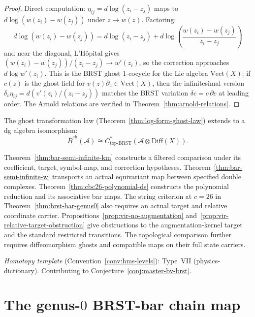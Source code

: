 \begin{proof}
Direct computation: $\eta_{ij} = d\log(z_i - z_j)$
maps to $d\log(w(z_i) - w(z_j))$ under $z \to w(z)$.
Factoring:
\[
d\log(w(z_i) - w(z_j)) = d\log(z_i - z_j)
+ d\log\!\left(\frac{w(z_i) - w(z_j)}{z_i - z_j}\right)
\]
and near the diagonal, L'H\^opital gives
$(w(z_i) - w(z_j))/(z_i - z_j) \to w'(z_i)$, so
the correction approaches $d\log w'(z_i)$.  This is
the BRST ghost 1-cocycle for the Lie algebra
$\mathrm{Vect}(X)$: if $c(z)$ is the ghost field for
$v(z)\partial_z \in \mathrm{Vect}(X)$, then the
infinitesimal version
$\delta_v \eta_{ij} = d(v'(z_i)/(z_i - z_j))$ matches
the BRST variation $\delta c = c\,\partial c$ at leading
order.  The Arnold relations are verified in
Theorem~\ref{thm:arnold-relations}.
\end{proof}

\begin{conjecture}[Bar complex \texorpdfstring{$=$}{=} topological BRST;
\ClaimStatusConjectured]
\label{conj:bar-topological-brst}
The ghost transformation law
(Theorem~\ref{thm:log-form-ghost-law}) extends to a dg
algebra isomorphism:
\[
\bar{B}^{\mathrm{ch}}(\mathcal{A}) \cong
C^*_{\mathrm{top}\text{-}\mathrm{BRST}}(\mathcal{A}
\otimes \mathrm{Diff}(X)).
\]
\end{conjecture}

\begin{remark}
\label{rem:topological-brst-scope}
Theorem~\ref{thm:bar-semi-infinite-km} constructs a filtered comparison under its coefficient, target, symbol-map, and correction hypotheses.
Theorem~\ref{thm:bar-semi-infinite-w} transports an actual equivariant map between specified double complexes.
Theorem~\ref{thm:cbc26-polynomial-ds} constructs the polynomial reduction and its associative bar maps.
The string criterion at $c=26$ in Theorem~\ref{thm:brst-bar-genus0} also requires an actual target and relative coordinate carrier.
Propositions~\ref{prop:vir-no-augmentation} and~\ref{prop:vir-relative-target-obstruction} give obstructions to the augmentation-kernel target and the standard restricted transitions.
The topological comparison further requires diffeomorphism ghosts and compatible maps on their full state carriers.

\emph{Homotopy template} (Convention~\ref{conv:hms-levels}): Type~VII (physics-dictionary).  Contributing to Conjecture~\ref{conj:master-bv-brst}.
\end{remark}

\section{The genus-\texorpdfstring{$0$}{0} BRST-bar chain map}
\label{sec:brst-bar-chain-map}


